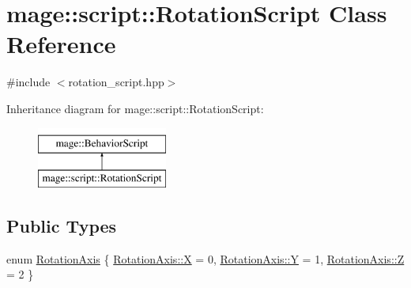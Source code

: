 \hypertarget{classmage_1_1script_1_1_rotation_script}{}\section{mage\+:\+:script\+:\+:Rotation\+Script Class Reference}
\label{classmage_1_1script_1_1_rotation_script}


{\ttfamily \#include $<$rotation\+\_\+script.\+hpp$>$}

Inheritance diagram for mage\+:\+:script\+:\+:Rotation\+Script\+:\begin{figure}[H]
\begin{center}
\leavevmode
\includegraphics[height=2.000000cm]{classmage_1_1script_1_1_rotation_script}
\end{center}
\end{figure}
\subsection*{Public Types}
\begin{DoxyCompactItemize}
\item 
enum \hyperlink{classmage_1_1script_1_1_rotation_script_aa8a91cc8c771fc777ffb5e8a28c43ad2}{Rotation\+Axis} \{ \hyperlink{classmage_1_1script_1_1_rotation_script_aa8a91cc8c771fc777ffb5e8a28c43ad2a02129bb861061d1a052c592e2dc6b383}{Rotation\+Axis\+::X} = 0, 
\hyperlink{classmage_1_1script_1_1_rotation_script_aa8a91cc8c771fc777ffb5e8a28c43ad2a57cec4137b614c87cb4e24a3d003a3e0}{Rotation\+Axis\+::Y} = 1, 
\hyperlink{classmage_1_1script_1_1_rotation_script_aa8a91cc8c771fc777ffb5e8a28c43ad2a21c2e59531c8710156d34a3c30ac81d5}{Rotation\+Axis\+::Z} = 2
 \}
\end{DoxyCompactItemize}
